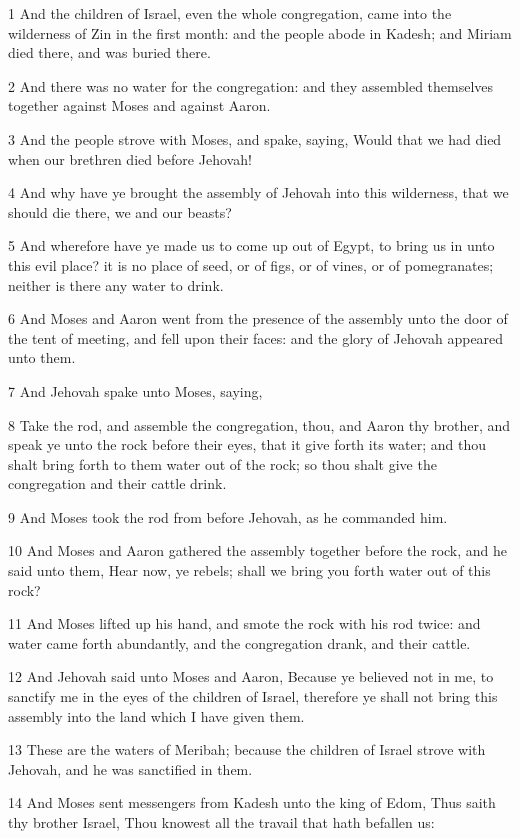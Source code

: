 \par 1 And the children of Israel, even the whole congregation, came into the wilderness of Zin in the first month: and the people abode in Kadesh; and Miriam died there, and was buried there.
\par 2 And there was no water for the congregation: and they assembled themselves together against Moses and against Aaron.
\par 3 And the people strove with Moses, and spake, saying, Would that we had died when our brethren died before Jehovah!
\par 4 And why have ye brought the assembly of Jehovah into this wilderness, that we should die there, we and our beasts?
\par 5 And wherefore have ye made us to come up out of Egypt, to bring us in unto this evil place? it is no place of seed, or of figs, or of vines, or of pomegranates; neither is there any water to drink.
\par 6 And Moses and Aaron went from the presence of the assembly unto the door of the tent of meeting, and fell upon their faces: and the glory of Jehovah appeared unto them.
\par 7 And Jehovah spake unto Moses, saying,
\par 8 Take the rod, and assemble the congregation, thou, and Aaron thy brother, and speak ye unto the rock before their eyes, that it give forth its water; and thou shalt bring forth to them water out of the rock; so thou shalt give the congregation and their cattle drink.
\par 9 And Moses took the rod from before Jehovah, as he commanded him.
\par 10 And Moses and Aaron gathered the assembly together before the rock, and he said unto them, Hear now, ye rebels; shall we bring you forth water out of this rock?
\par 11 And Moses lifted up his hand, and smote the rock with his rod twice: and water came forth abundantly, and the congregation drank, and their cattle.
\par 12 And Jehovah said unto Moses and Aaron, Because ye believed not in me, to sanctify me in the eyes of the children of Israel, therefore ye shall not bring this assembly into the land which I have given them.
\par 13 These are the waters of Meribah; because the children of Israel strove with Jehovah, and he was sanctified in them.
\par 14 And Moses sent messengers from Kadesh unto the king of Edom, Thus saith thy brother Israel, Thou knowest all the travail that hath befallen us:
